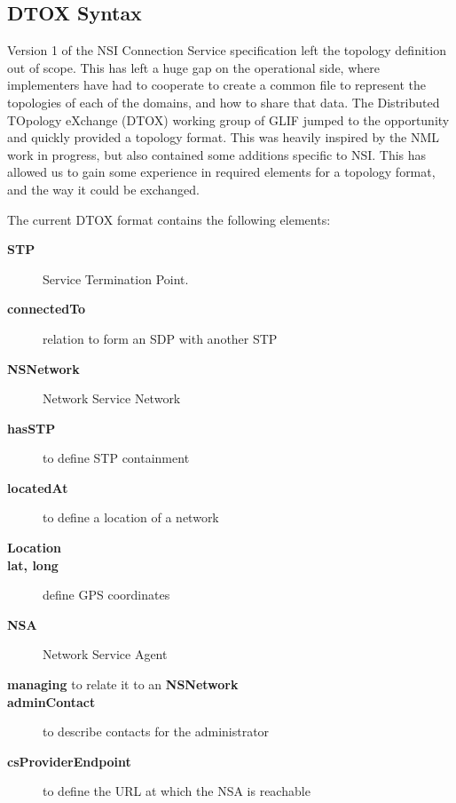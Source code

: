 \documentclass[12pt]{article}  %
\begin{document}
\subsection{DTOX Syntax}

 Version 1 of the NSI Connection Service specification left the 
topology definition out of scope. This has left a huge gap on the operational side, 
where implementers have had to cooperate to create a common file to represent the 
topologies of each of the domains, and how to share that data. The Distributed 
TOpology eXchange (DTOX) working group of GLIF jumped to the opportunity and quickly 
provided a topology format. This was heavily inspired by the NML work in progress, 
but also contained some additions specific to NSI. This has allowed us to gain 
some experience in required elements for a topology format, and the way it could 
be exchanged.\


 The current DTOX format contains the following elements:

 \begin{description}

   \item[\textbf{STP}] Service Termination Point.

   \item[\textbf{connectedTo}]  relation to form an SDP 
  with another STP

   \item[\textbf{NSNetwork}]  Network Service Network

   \item[\textbf{hasSTP }] to define STP containment

   \item[\textbf{locatedAt}]  to define a location of a network
   \item[\textbf{Location}]

   \item[\textbf{lat, long}]  define GPS coordinates

   \item[\textbf{NSA}]  Network Service Agent

   \item[\textbf{managing}  to relate it to an  \textbf{NSNetwork}]

   \item[\textbf{adminContact}]  to describe contacts for the administrator

   \item[\textbf{csProviderEndpoint}]  to define the URL at which the NSA is reachable

 \end{description}
\end{document}
